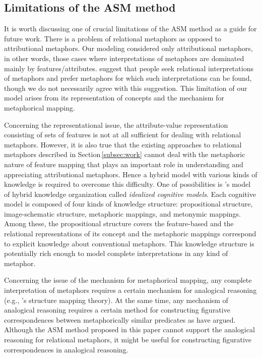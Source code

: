 \subsection{Limitations of the ASM method} \label{sec:limitations}
It is worth discussing one of crucial limitations of the ASM method as a guide 
for future work.
There is a problem of relational metaphors as opposed to attributional metaphors.  
Our modeling considered only attributional
metaphors, in other words, those cases where interpretations of
metaphors are dominated mainly by features/attributes. 
 suggest that people seek relational 
interpretations of metaphors and prefer metaphors for which such
interpretations can be found, though we do not necessarily agree with
this suggestion. This limitation of our model arises from its
representation of concepts and the mechanism for metaphorical mapping.

Concerning the representational issue, the attribute-value
representation consisting of sets of features is not at all sufficient
for dealing with relational metaphors.  However, it is also true that
the existing approaches to relational metaphors described in Section\,\ref{subsec:work} 
cannot deal with the metaphoric nature of 
feature mapping that plays an important role in understanding and appreciating
attributional metaphors.  Hence a hybrid model with various kinds of
knowledge is required to overcome this difficulty.  One of
possibilities is \citeauthor{Lakoff87}'s\citeyear{Lakoff87} model of hybrid knowledge
organization called {\it idealized cognitive models}. Each
cognitive model is composed of four kinds of knowledge structure: 
propositional structure, image-schematic structure, metaphoric mappings, 
and metonymic mappings. Among these, the propositional structure covers
the feature-based and the relational representations of its concept
and the metaphoric mappings correspond to explicit knowledge about
conventional metaphors.  This knowledge structure is potentially rich
enough to model complete interpretations in any kind of metaphor.

Concerning the issue of the mechanism for metaphorical mapping, 
any complete interpretation of 
metaphors requires a certain mechanism for analogical reasoning (e.g.,
\citeauthor{Gentner83}'s\citeyear{Gentner83} structure mapping theory). 
At the same time, any mechanism of analogical reasoning requires a certain method for
constructing figurative correspondences between metaphorically similar
predicates as  have argued.  Although the ASM method
proposed in this paper cannot support the analogical reasoning for
relational metaphors, it might be useful for constructing figurative
correspondences in analogical reasoning.

